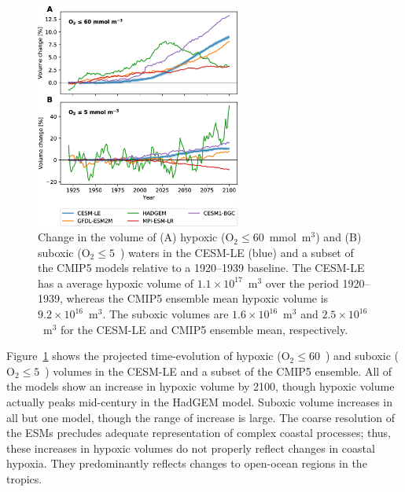 \documentclass{report_chapter}
\begin{document}
\begin{figure}[tbp]
\centering
\includegraphics[width=0.6\textwidth]{volume-census.png}
\caption{Change in the volume of (A) hypoxic ($\mathrm{O}_2\le60$~mmol~m$^{3}$) and (B) suboxic ($\mathrm{O}_2\le5$~\mmolmmm{}) waters in the CESM-LE (blue) and a subset of the CMIP5 models relative to a 1920--1939 baseline.
The CESM-LE has a average hypoxic volume of ${1.1\times10^{17}}$~m$^{3}$ over the period 1920--1939, whereas the CMIP5 ensemble mean hypoxic volume is ${9.2\times10^{16}}$~m$^{3}$.
The suboxic volumes are ${1.6\times10^{16}}$~m$^{3}$ and ${2.5\times10^{16}}$~m$^{3}$ for the CESM-LE and CMIP5 ensemble mean, respectively.
}
\label{fig:volumes}
\end{figure}

Figure~\ref{fig:volumes} shows the projected time-evolution of hypoxic ($\mathrm{O}_2\le60$~\mmolmmm{}) and suboxic ($\mathrm{O}_2\le5$~\mmolmmm{}) volumes in the CESM-LE and a subset of the CMIP5 ensemble.
All of the models show an increase in hypoxic volume by 2100, though hypoxic volume actually peaks mid-century in the HadGEM model.
Suboxic volume increases in all but one model, though the range of increase is large.
The coarse resolution of the ESMs precludes adequate representation of complex coastal processes; thus, these increases in hypoxic volumes do not properly reflect changes in coastal hypoxia.
They predominantly reflects changes to open-ocean regions in the tropics.
\end{document}

